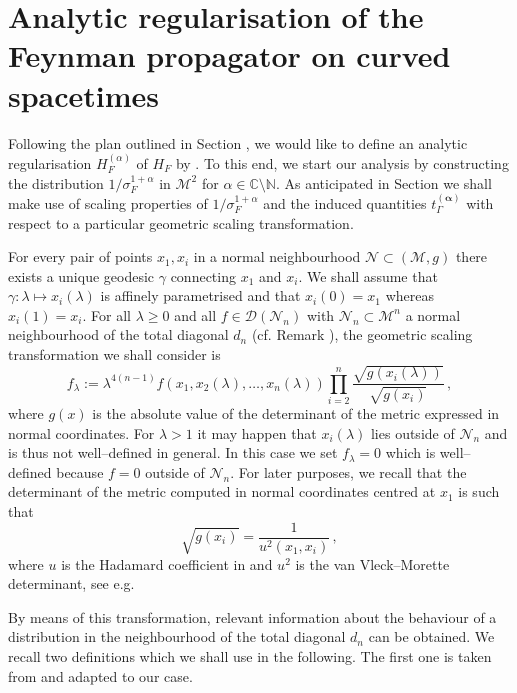\documentclass[10pt]{book}
\newcommand{\Dcal}{\mathcal{D}}
\newcommand{\Mcal}{\mathcal{M}}
\newcommand{\Ncal}{\mathcal{N}}
\theoremstyle{break}
\begin{document}
\section{Analytic regularisation of the Feynman propagator on curved spacetimes}


Following the plan outlined in Section %
, we would like to define an analytic regularisation $H^{(\alpha)}_F$ of $H_F$ by %
. To this end, we start our analysis by constructing the distribution $1/\sigma_F^{1+\alpha}$ in $\Mcal^2$ for $\alpha\in \mathbb{C} \setminus \mathbb{N}$. As anticipated in Section %
we shall make use of scaling properties of $1/\sigma_F^{1+\alpha}$ and the induced quantities $t^{(\boldsymbol{\alpha})}_\Gamma$ %
with respect to a particular geometric scaling transformation. 

For every pair of points $x_1,x_i$ in a normal neighbourhood $\Ncal\subset (\Mcal,g)$ there exists a unique geodesic $\gamma$ connecting $x_1$ and $x_i$. We shall assume that $\gamma:\lambda \mapsto x_i(\lambda)$ is affinely parametrised and that $x_i(0) =x_1$ whereas $x_i(1) = x_i$. 
For all $\lambda\ge0$ and all $f\in \Dcal(\Ncal_n)$ with $\Ncal_n\subset \Mcal^n$ a normal neighbourhood of the total diagonal $d_n$ (cf. Remark %
), the geometric scaling transformation we shall consider is
\begin{equation*}
f_\lambda := \lambda^{4(n-1)}f(x_1,x_2(\lambda ), \dots, x_n(\lambda))  \prod_{i=2}^n\frac{\sqrt{g(x_i(\lambda ))}}{\sqrt{g(x_i)}}\,,
\end{equation*}
where $g(x)$ is the absolute value of the determinant of the metric expressed in normal coordinates. For $\lambda>1$ it may happen that $x_i(\lambda)$ lies outside of $\Ncal_n$ and is thus not well--defined in general. In this case we set $f_\lambda=0$ which is well--defined because $f=0$ outside of $\Ncal_n$. For later purposes, we recall that the determinant of the metric computed in normal coordinates centred at $x_1$ is such that 
\[
\sqrt{g(x_i)} = \frac{1}{u^2(x_1,x_i)}\,,
\]
where $u$ is the Hadamard coefficient in %
and $u^2$ is the van Vleck--Morette determinant, see e.g.  %

By means of this transformation, relevant information about the behaviour of a distribution in the neighbourhood of the total diagonal $d_n$ can be obtained. We recall two definitions which we shall use in the following. The first one is taken from %
and adapted to our case.
\end{document}
